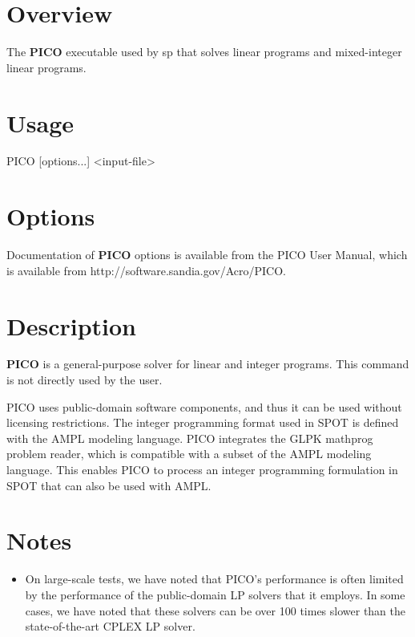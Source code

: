 \section{Overview}\label{picoExecutable_picoOverview}
The {\bfseries PICO} executable used by {\ttfamily sp} that solves linear programs and mixed-\/integer linear programs.\section{Usage}\label{picoExecutable_picoUsage}
\begin{verb}
   PICO [options...] <input-file>
\end{verb}
\section{Options}\label{picoExecutable_picoOptions}
Documentation of {\bfseries PICO} options is available from the PICO User Manual, which is available from   
http://software.sandia.gov/Acro/PICO.
\section{Description}\label{picoExecutable_picoDescription}
{\bfseries PICO} is a general-\/purpose solver for linear and integer programs. This command is not directly used by the user.

PICO uses public-\/domain software components, and thus it can be used without licensing restrictions. The integer programming format used in SPOT is defined with the AMPL modeling language. PICO integrates the GLPK mathprog problem reader, which is compatible with a subset of the AMPL modeling language. This enables PICO to process an integer programming formulation in SPOT that can also be used with AMPL.\section{Notes}\label{picoExecutable_picoNotes}

\begin{itemize}
\item On large-\/scale tests, we have noted that PICO's performance is often limited by the performance of the public-\/domain LP solvers that it employs. In some cases, we have noted that these solvers can be over 100 times slower than the state-\/of-\/the-\/art CPLEX LP solver. 
\end{itemize}

